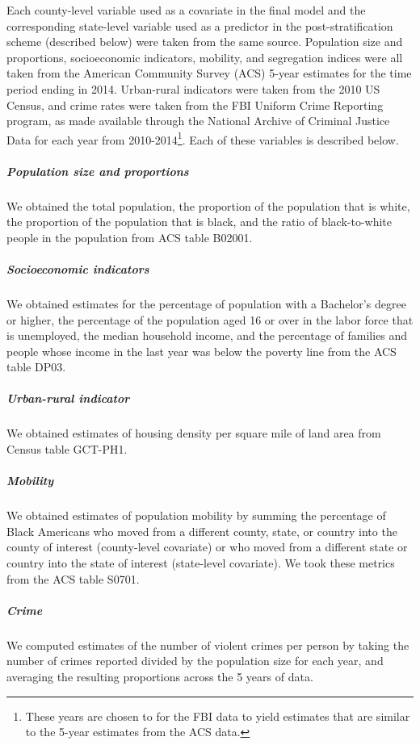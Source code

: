 \documentclass[9pt,twocolumn,twoside,lineno]{pnas-new}
\begin{document}
Each county-level variable used as a covariate in the final model and
the corresponding state-level variable used as a predictor in the
post-stratification scheme (described below) were taken from the same
source. Population size and proportions, socioeconomic indicators,
mobility, and segregation indices were all taken from the American
Community Survey (ACS) 5-year estimates for the time period ending in
2014. Urban-rural indicators were taken from the 2010 US Census, and
crime rates were taken from the FBI Uniform Crime Reporting program, as
made available through the National Archive of Criminal Justice Data for
each year from 2010-2014\footnote{These years are chosen to for the FBI
  data to yield estimates that are similar to the 5-year estimates from
  the ACS data.}. Each of these variables is described below.

\subparagraph{Population size and
proportions}\label{population-size-and-proportions}

We obtained the total population, the proportion of the population that
is white, the proportion of the population that is black, and the ratio
of black-to-white people in the population from ACS table B02001.

\subparagraph{Socioeconomic indicators}\label{socioeconomic-indicators}

We obtained estimates for the percentage of population with a Bachelor's
degree or higher, the percentage of the population aged 16 or over in
the labor force that is unemployed, the median household income, and the
percentage of families and people whose income in the last year was
below the poverty line from the ACS table DP03.

\subparagraph{Urban-rural indicator}\label{urban-rural-indicator}

We obtained estimates of housing density per square mile of land area
from Census table GCT-PH1.

\subparagraph{Mobility}\label{mobility}

We obtained estimates of population mobility by summing the percentage
of Black Americans who moved from a different county, state, or country
into the county of interest (county-level covariate) or who moved from a
different state or country into the state of interest (state-level
covariate). We took these metrics from the ACS table S0701.

\subparagraph{Crime}\label{crime}

We computed estimates of the number of violent crimes per person by
taking the number of crimes reported divided by the population size for
each year, and averaging the resulting proportions across the 5 years of
data.
\end{document}
